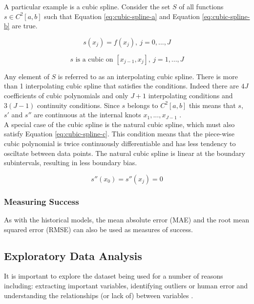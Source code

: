 A particular example is a cubic spline. Consider the set $S$ of all functions $s \in C^2[a,b]$ such that Equation \ref{eq:cubic-spline-a} and Equation \ref{eq:cubic-spline-b} are true.

\begin{equation}
\label{eq:cubic-spline-a}
    s(x_j) = f(x_j),\ j = 0,...,J
\end{equation}

\begin{equation}
\label{eq:cubic-spline-b}
    s \textrm{ is a cubic on } [x_{j-1}, x_j],\ j=1,...,J
\end{equation}

Any element of $S$ is referred to as an interpolating cubic spline. There is more than 1 interpolating cubic spline that satisfies the conditions. Indeed there are $4J$  coefficients of cubic polynomials and only $J+1$ interpolating conditions and $3(J-1)$ continuity conditions. Since $s$ belongs to $C^2[a, b]$ this means that $s$, $s'$ and $s''$ are continuous at the internal knots $x_1, ..., x_{J-1}$ \cite{intro-to-numerical-analysis-suli}. \\

A special case of the cubic spline is the natural cubic spline, which must also satisfy Equation \ref{eq:cubic-spline-c}. This condition means that the piece-wise cubic polynomial is twice continuously differentiable and has less tendency to osciltate between data points. The natural cubic spline is linear at the boundary subintervals, resulting in less boundary bias.

\begin{equation}
    \label{eq:cubic-spline-c}
     s''(x_0) = s''(x_j) = 0
\end{equation}

\subsubsection{Measuring Success}

As with the historical models, the mean absolute error (MAE) and the root mean squared error (RMSE) can also be used as measures of success.

\subsection{Exploratory Data Analysis}

It is important to explore the dataset being used for a number of reasons including: extracting important variables, identifying outliers or human error and understanding the relationships (or lack of) between variables \cite{significance-of-eda}. \\

